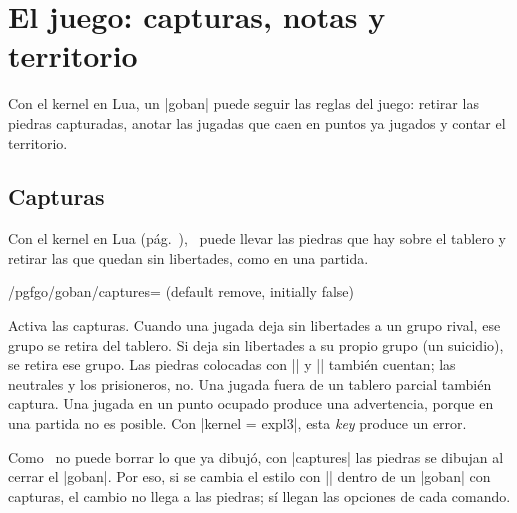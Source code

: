 \section{El juego: capturas, notas y territorio}
\label{sec:juego}

Con el kernel en Lua, un |goban| puede seguir las reglas del juego: retirar las piedras capturadas, anotar las jugadas que caen en puntos ya jugados y contar el territorio.

	\subsection{Capturas}
	\label{subsec:capturas}

	Con el kernel en Lua (pág.~\pageref{subsec:kernel}), \pgfgoname\ puede llevar las piedras que hay sobre el tablero y retirar las que quedan sin libertades, como en una partida.

	\begin{key}{/pgfgo/goban/captures= (default remove, initially false)}

		Activa las capturas. Cuando una jugada deja sin libertades a un grupo rival, ese grupo se retira del tablero. Si deja sin libertades a su propio grupo (un suicidio), se retira ese grupo. Las piedras colocadas con |\stone| y |\stones| también cuentan; las neutrales y los prisioneros, no. Una jugada fuera de un tablero parcial también captura. Una jugada en un punto ocupado produce una advertencia, porque en una partida no es posible. Con |kernel = expl3|, esta \emph{key} produce un error.

		\begin{codeexample}[]

			\begin{goban}
			\end{goban}

			\begin{goban}[captures]
			\end{goban}
		\end{codeexample}

		Como \pgfname\ no puede borrar lo que ya dibujó, con |captures| las piedras se dibujan al cerrar el |goban|. Por eso, si se cambia el estilo con |\pgfgoset| dentro de un |goban| con capturas, el cambio no llega a las piedras; sí llegan las opciones de cada comando.
	\end{key}

